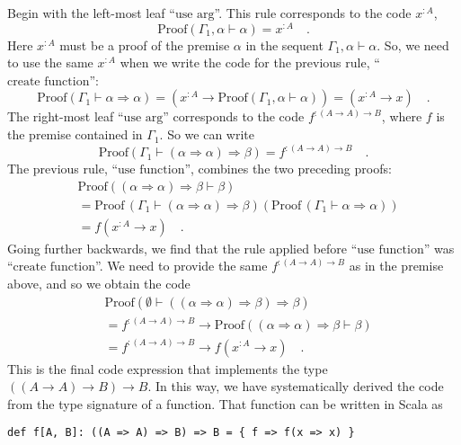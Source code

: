 Begin with the left-most leaf \textsf{``}$\text{use arg}$\textsf{''}. This rule corresponds
to the code $x^{:A}$,
\[
\text{Proof}\left(\Gamma_{1},\alpha\vdash\alpha\right)=x^{:A}\quad.
\]
Here $x^{:A}$ must be a proof of the premise $\alpha$ in the sequent
$\Gamma_{1},\alpha\vdash\alpha$. So, we need to use the same $x^{:A}$
when we write the code for the previous rule, \textsf{``}$\text{create function}$\textsf{''}:
\[
\text{Proof}\left(\Gamma_{1}\vdash\alpha\Rightarrow\alpha\right)=(x^{:A}\rightarrow\text{Proof}\left(\Gamma_{1},\alpha\vdash\alpha\right))=(x^{:A}\rightarrow x)\quad.
\]
The right-most leaf \textsf{``}$\text{use arg}$\textsf{''} corresponds to the code
$f^{:(A\rightarrow A)\rightarrow B}$, where $f$ is the premise contained
in $\Gamma_{1}$. So we can write
\[
\text{Proof}\left(\Gamma_{1}\vdash(\alpha\Rightarrow\alpha)\Rightarrow\beta\right)=f^{:(A\rightarrow A)\rightarrow B}\quad.
\]
The previous rule, \textsf{``}$\text{use function}$\textsf{''}, combines the two
preceding proofs:
\begin{align*}
 & \text{Proof}\left((\alpha\Rightarrow\alpha)\Rightarrow\beta\vdash\beta\right)\\
 & =\text{Proof}\,(\Gamma_{1}\vdash(\alpha\Rightarrow\alpha)\Rightarrow\beta)\left(\text{Proof}\,(\Gamma_{1}\vdash\alpha\Rightarrow\alpha)\right)\\
 & =f(x^{:A}\rightarrow x)\quad.
\end{align*}
Going further backwards, we find that the rule applied before \textsf{``}$\text{use function}$\textsf{''}
was \textsf{``}$\text{create function}$\textsf{''}. We need to provide the same $f^{:\left(A\rightarrow A\right)\rightarrow B}$
as in the premise above, and so we obtain the code
\begin{align*}
 & \text{Proof}\left(\emptyset\vdash((\alpha\Rightarrow\alpha)\Rightarrow\beta)\Rightarrow\beta\right)\\
 & =f^{:\left(A\rightarrow A\right)\rightarrow B}\rightarrow\text{Proof}\left((\alpha\Rightarrow\alpha)\Rightarrow\beta\vdash\beta\right)\\
 & =f^{:\left(A\rightarrow A\right)\rightarrow B}\rightarrow f(x^{:A}\rightarrow x)\quad.
\end{align*}
This is the final code expression that implements the type $((A\rightarrow A)\rightarrow B)\rightarrow B$.
In this way, we have systematically derived the code from the type
signature of a function. That function can be written in Scala as
\begin{lstlisting}
def f[A, B]: ((A => A) => B) => B = { f => f(x => x) }
\end{lstlisting}


